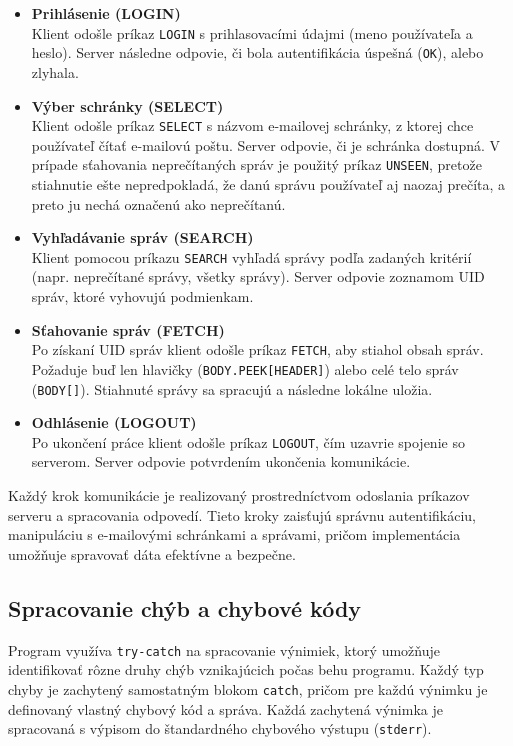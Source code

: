 \documentclass[a4paper, 11pt]{article}
\begin{document}
	\begin{itemize}
		\item \textbf{Prihlásenie (LOGIN)} \\
		Klient odošle príkaz \texttt{LOGIN} s prihlasovacími údajmi (meno používateľa a heslo). Server následne odpovie, či bola autentifikácia úspešná (\texttt{OK}), alebo zlyhala.

		\item \textbf{Výber schránky (SELECT)} \\
		Klient odošle príkaz \texttt{SELECT} s názvom e-mailovej schránky, z ktorej chce používateľ čítať e-mailovú poštu. Server odpovie, či je schránka dostupná. V prípade sťahovania neprečítaných správ je použitý príkaz \texttt{UNSEEN}, pretože stiahnutie ešte nepredpokladá, že danú správu používateľ aj naozaj prečíta, a preto ju nechá označenú ako neprečítanú.

		\item \textbf{Vyhľadávanie správ (SEARCH)} \\
		Klient pomocou príkazu \texttt{SEARCH} vyhľadá správy podľa zadaných kritérií (napr. neprečítané správy, všetky správy). Server odpovie zoznamom UID správ, ktoré vyhovujú podmienkam.

		\item \textbf{Sťahovanie správ (FETCH)} \\
		Po získaní UID správ klient odošle príkaz \texttt{FETCH}, aby stiahol obsah správ. Požaduje buď len hlavičky (\texttt{BODY.PEEK[HEADER]}) alebo celé telo správ (\texttt{BODY[]}). Stiahnuté správy sa spracujú a následne lokálne uložia.

		\item \textbf{Odhlásenie (LOGOUT)} \\
		Po ukončení práce klient odošle príkaz \texttt{LOGOUT}, čím uzavrie spojenie so serverom. Server odpovie potvrdením ukončenia komunikácie.
	\end{itemize}
	Každý krok komunikácie je realizovaný prostredníctvom odoslania príkazov serveru a spracovania odpovedí. Tieto kroky zaisťujú správnu autentifikáciu, manipuláciu s e-mailovými schránkami a správami, pričom implementácia umožňuje spravovať dáta efektívne a bezpečne.

	\subsection{Spracovanie chýb a chybové kódy}

	Program využíva \texttt{try-catch} na spracovanie výnimiek, ktorý umožňuje identifikovať rôzne druhy chýb vznikajúcich počas behu programu. Každý typ chyby je zachytený samostatným blokom \texttt{catch}, pričom pre každú výnimku je definovaný vlastný chybový kód a správa. Každá zachytená výnimka je spracovaná s výpisom do štandardného chybového výstupu (\texttt{stderr}).
	
\end{document}
